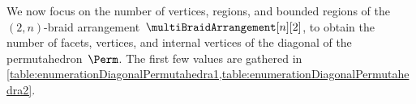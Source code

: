 
We now focus on the number of vertices, regions, and bounded regions of the $(2,n)$-braid arrangement~$\multiBraidArrangement[n][2]$, to obtain the number of facets, vertices, and internal vertices of the diagonal of the permutahedron~$\Perm$.
The first few values are gathered in \cref{table:enumerationDiagonalPermutahedra1,table:enumerationDiagonalPermutahedra2}.

